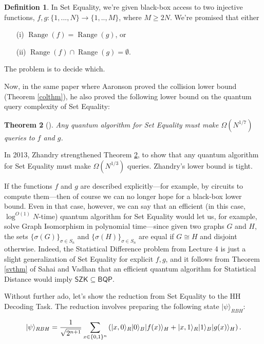 \documentclass[11pt]{report}
\theoremstyle{plain}
\newtheorem{theorem}{Theorem}[section]
\theoremstyle{definition}
\newtheorem{definition}[theorem]{Definition}
\renewcommand{\ket}[1]{|#1\rangle}
\begin{document}
\begin{definition}
In Set Equality, we're given black-box access to two injective functions,
$f,g: \{1,...,N\} \rightarrow \{1,..,M\}$, where $M \geq 2N$.
We're promised that either
\begin{enumerate}
\item[(i)] $\operatorname*{Range}(f) = \operatorname*{Range}(g)$, or
\item[(ii)] $\operatorname*{Range}(f) \cap \operatorname*{Range}(g) = \emptyset$.
\end{enumerate}
The problem is to decide which.
\end{definition}

Now, in the same paper \cite{aar:col} where Aaronson proved the collision lower bound (Theorem \ref{colthm}), he also proved the following
lower bound on the quantum query complexity of Set Equality:

\begin{theorem}[\cite{aar:col}]
\label{seteqthm}
Any quantum algorithm for Set Equality must make
$\Omega(N^{1/7})$ queries to $f$ and $g$.
\end{theorem}

In 2013, Zhandry \cite{zhandry:col} strengthened Theorem \ref{seteqthm}, to show
that any quantum algorithm for Set Equality
must make $\Omega(N^{1/3})$ queries.  Zhandry's lower bound is tight.

If the functions $f$ and $g$ are described explicitly---for example, by circuits to compute them---then
of course we can no longer hope for a black-box lower bound.  Even in that case, however, we can say
that an efficient (in this case, $\log^{O(1)} N$-time) quantum algorithm for Set Equality would let us, for example,
solve Graph Isomorphism in polynomial time---since given two graphs $G$ and $H$, the sets $\{\sigma(G)\}_{\sigma\in S_n}$ and
$\{\sigma(H)\}_{\sigma\in S_n}$ are equal if $G\cong H$ and disjoint otherwise.  Indeed, the Statistical Difference
problem from Lecture 4 is just a slight generalization of Set Equality for explicit $f,g$, and it follows from Theorem \ref{svthm}
of Sahai and Vadhan \cite{DBLP:journals/jacm/SahaiV03} that an efficient quantum algorithm for Statistical Distance
would imply $\mathsf{SZK}\subseteq \mathsf{BQP}$.

Without further ado, let's show the reduction from Set Equality to the HH Decoding Task.  The reduction involves preparing
the following state $\ket{\psi}_{RBH}$:

$$\ket{\psi}_{RBH} = {1 \over \sqrt{2^{n+1}}}
\sum_{x\in\{0,1\}^n} \left( \ket{x,0}_R \ket{0}_B \ket{f(x)}_H + \ket{x,1}_R \ket{1}_B \ket{g(x)}_H \right).
$$
\end{document}
